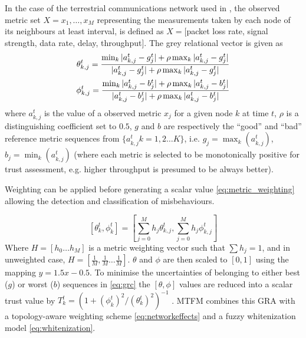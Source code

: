\documentclass[conference]{IEEEtran}
\begin{document}
In the case of the terrestrial communications network used in \cite{Guo11}, the observed metric set $X = {x_1,\dots,x_M}$ representing the measurements taken by each node of its neighbours at least interval, is defined as $X=[$packet loss rate, signal strength, data rate, delay, throughput$]$.
The grey relational vector is given as
%
\begin{align}
  \label{eq:grc}
  \theta_{k,j}^t = \frac{\min_k|a_{k,j}^t - g_j^t| + \rho \max_k|a_{k,j}^t-g_j^t|}{|a_{k,j}^t-g_j^t| + \rho \max_k|a_{k,j}^t-g_j^t|} \\
  \phi_{k,j}^t = \frac{\min_k|a_{k,j}^t - b_j^t| + \rho \max_k|a_{k,j}^t-b_j^t|}{|a_{k,j}^t-b_j^t| + \rho \max_k|a_{k,j}^t-b_j^t|} \notag 
\end{align}
%
where $a_{k,j}^t$ is the value of a observed metric $x_j$ for a given node $k$ at time $t$, $\rho$ is a distinguishing coefficient set to $0.5$, $g$ and $b$ are respectively the ``good'' and ``bad'' reference metric sequences from $\{a_{k,j}^t k=1,2\dots K\}$, i.e. $g_j=\max_k({a_{k,j}^t})$,  $b_j=\min_k({a_{k,j}^t})$ (where each metric is selected to be monotonically positive for trust assessment, e.g. higher throughput is presumed to be always better). 

Weighting can be applied before generating a scalar value \eqref{eq:metric_weighting} allowing the detection and classification of misbehaviours.

%
\begin{equation}
  \label{eq:metric_weighting}
  [\theta_k^t, \phi_k^t] = \left[\sum_{j=0}^M h_j \theta_{k,j}^t,\sum_{j=0}^M h_j \phi_{k,j}^t \right]
\end{equation}
%
Where $H=[h_0\dots h_M]$ is a metric weighting vector such that $\sum h_j = 1$, and in unweighted case, $H=[\frac{1}{M},\frac{1}{M}\dots\frac{1}{M}]$.
$\theta$ and $\phi$ are then scaled to $[0,1]$ using the mapping $y = 1.5 x - 0.5$.
To minimise the uncertainties of belonging to either best ($g$) or worst ($b$) sequences in \eqref{eq:grc} the $[\theta,\phi]$ values are reduced into a scalar trust value by $T_k^t = ({1+{(\phi_k^t)^2}/{(\theta_k^t)^2}})^{-1}$ \cite{Hong2010}.
MTFM combines this GRA with a topology-aware weighting scheme \eqref{eq:networkeffects} and a fuzzy whitenization model \eqref{eq:whitenization}. 
\end{document}
